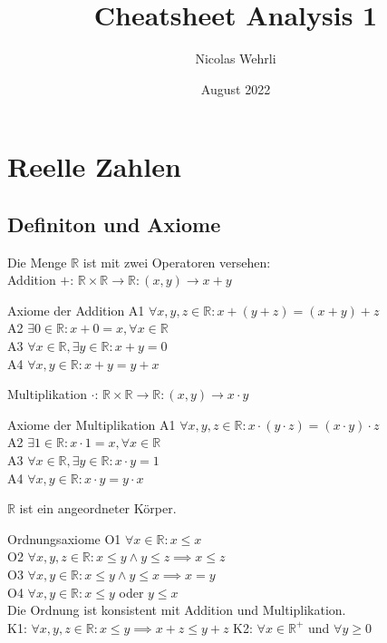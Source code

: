 \documentclass[a4paper,fontsize = 7pt]{scrartcl}
\title{Cheatsheet Analysis 1}
\author{Nicolas Wehrli}
\date{August 2022}
\def\R{\mathbb{R}}
\begin{document}
\maketitle

\section{Reelle Zahlen}
\subsection{Definiton und Axiome}
Die Menge $\R $ ist mit zwei Operatoren versehen: \\
Addition $+$: $\R \times \R \to \R:  (x,y) \to x+y$ 
\begin{subbox}{Axiome der Addition}
  \vspace{-6pt}
  A1 $\forall x,y,z \in \R: x+(y+z) = (x+y)+z$\\
  A2 $\exists 0\in\R: x + 0 = x, \forall x \in \R$\\
  A3 $\forall x \in \R, \exists y \in \R: x+y = 0$\\
  A4 $\forall x,y \in \R: x+y = y+x$
  \vspace{-6pt}
\end{subbox}
Multiplikation $\cdot$: $\R \times \R \to \R: (x,y) \to x\cdot y$

\begin{subbox}{Axiome der Multiplikation}
  \vspace{-6pt}
  A1 $\forall x,y,z \in \R: x\cdot(y \cdot z) = (x \cdot y)\cdot z$\\
  A2 $\exists 1\in\R: x \cdot 1 = x, \forall x \in \R$\\
  A3 $\forall x \in \R, \exists y \in \R: x \cdot y = 1$\\
  A4 $\forall x,y \in \R: x \cdot y = y \cdot x$
  \vspace{-6pt}
\end{subbox}

$\R$ ist ein angeordneter Körper.

\begin{subbox}{Ordnungsaxiome}
  \vspace{-6pt}
  O1 $\forall x \in \R: x \leq x$\\
  O2 $\forall x,y,z \in\R: x \leq y \land y \leq z \implies x \leq z$\\
  O3 $\forall x,y \in \R: x \leq y \land y \leq x \implies x = y$\\
  O4 $\forall x,y \in \R: x \leq y$ oder $y \leq x$\\
  Die Ordnung ist konsistent mit Addition und Multiplikation.\\
  K1: $\forall x,y,z \in \R : x \leq y \implies x + z \leq y + z$
  K2: $\forall x \in \R^{+}$ und $\forall y \geq 0$
  \vspace{-6pt}
\end{subbox}
\end{document}
